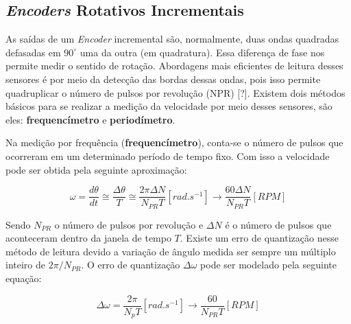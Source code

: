 \subsection{\textit{Encoders} Rotativos Incrementais}


As saídas de um \emph{Encoder} incremental são, normalmente, duas ondas quadradas defasadas em $90^\circ$ uma da outra (em quadratura). Essa diferença de fase nos permite medir o sentido de rotação. Abordagens mais eficientes de leitura desses sensores é por meio da detecção das bordas dessas ondas, pois isso permite quadruplicar o número de pulsos por revolução (NPR) [?]. Existem dois métodos básicos para se realizar a medição da velocidade por meio desses sensores, são eles: \textbf{frequencímetro} e \textbf{periodímetro}. 

Na medição por frequência (\textbf{frequencímetro}), conta-se o número de pulsos que ocorreram em um determinado período de tempo fixo. Com isso a velocidade pode ser obtida pela seguinte aproximação:

\begin{equation}
    \omega = \frac{d\theta}{dt} \cong \frac{\Delta{\theta}}{T} \cong \frac{2 \pi \Delta{N}}{N_{PR}T}[rad.s^{-1}] \xrightarrow{} \frac{60 \Delta{N}}{N_{PR} T} [RPM]
\end{equation}

Sendo $N_{PR}$ o número de pulsos por revolução e $\Delta{N}$ é o número de pulsos que aconteceram dentro da janela de tempo $T$. Existe um erro de quantização nesse método de leitura devido a variação de ângulo medida ser sempre um múltiplo inteiro de $ 2\pi/N_{PR}$. O erro de quantização $\Delta{\omega}$ pode ser modelado pela seguinte equação:

\begin{equation}
    \Delta{\omega} = \frac{2\pi}{N_{p}T}[rad.s^{-1}] \xrightarrow{} \frac{60}{N_{PR}T}[RPM]
    \label{eq:erro_de_quantizacao_frequencimetro}
\end{equation}

